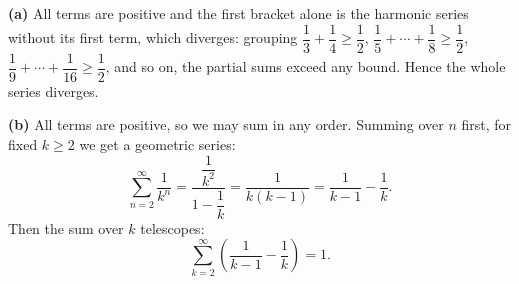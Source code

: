 \textbf{(a)} All terms are positive and the first bracket alone is the harmonic series without its first term, which diverges: grouping $\dfrac{1}{3}+\dfrac{1}{4}\ge\dfrac{1}{2}$, $\dfrac{1}{5}+\cdots+\dfrac{1}{8}\ge\dfrac{1}{2}$, $\dfrac{1}{9}+\cdots+\dfrac{1}{16}\ge\dfrac{1}{2}$, and so on, the partial sums exceed any bound. Hence the whole series diverges.

\textbf{(b)} All terms are positive, so we may sum in any order. Summing over $n$ first, for fixed $k\ge2$ we get a geometric series:
\[
\sum_{n=2}^{\infty}\dfrac{1}{k^n}=\dfrac{\dfrac{1}{k^2}}{1-\dfrac{1}{k}}=\dfrac{1}{k(k-1)}=\dfrac{1}{k-1}-\dfrac{1}{k} .
\]
Then the sum over $k$ telescopes:
\[
\sum_{k=2}^{\infty}\left(\dfrac{1}{k-1}-\dfrac{1}{k}\right)=\boxed{1}.
\]

